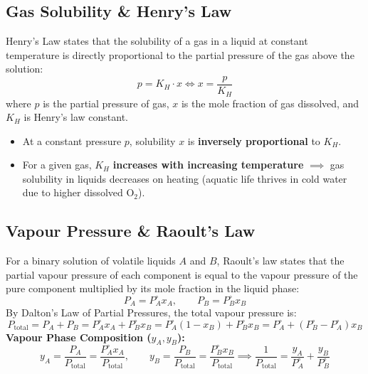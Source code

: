 \documentclass[10pt,a4paper]{article}
\begin{document}
\subsection{Gas Solubility \& Henry's Law}
Henry's Law states that the solubility of a gas in a liquid at constant temperature is directly proportional to the partial pressure of the gas above the solution:
\begin{equation}
  p = K_H \cdot x \iff x = \frac{p}{K_H}
\end{equation}
where $p$ is the partial pressure of gas, $x$ is the mole fraction of gas dissolved, and $K_H$ is Henry's law constant.
\begin{itemize}
  \item At a constant pressure $p$, solubility $x$ is \textbf{inversely proportional} to $K_H$.
  \item For a given gas, $K_H$ \textbf{increases with increasing temperature} $\implies$ gas solubility in liquids decreases on heating (aquatic life thrives in cold water due to higher dissolved $\mathrm{O_2}$).
\end{itemize}

\subsection{Vapour Pressure \& Raoult's Law}
For a binary solution of volatile liquids $A$ and $B$, Raoult's law states that the partial vapour pressure of each component is equal to the vapour pressure of the pure component multiplied by its mole fraction in the liquid phase:
\begin{equation}
  P_A = P_A^\circ x_A, \qquad P_B = P_B^\circ x_B
\end{equation}
By Dalton's Law of Partial Pressures, the total vapour pressure is:
\begin{equation}
  P_{\text{total}} = P_A + P_B = P_A^\circ x_A + P_B^\circ x_B = P_A^\circ(1 - x_B) + P_B^\circ x_B = P_A^\circ + (P_B^\circ - P_A^\circ)x_B
\end{equation}
\textbf{Vapour Phase Composition ($y_A, y_B$):}
\begin{equation}
  y_A = \frac{P_A}{P_{\text{total}}} = \frac{P_A^\circ x_A}{P_{\text{total}}}, \qquad y_B = \frac{P_B}{P_{\text{total}}} = \frac{P_B^\circ x_B}{P_{\text{total}}} \implies \frac{1}{P_{\text{total}}} = \frac{y_A}{P_A^\circ} + \frac{y_B}{P_B^\circ}
\end{equation}
\end{document}
